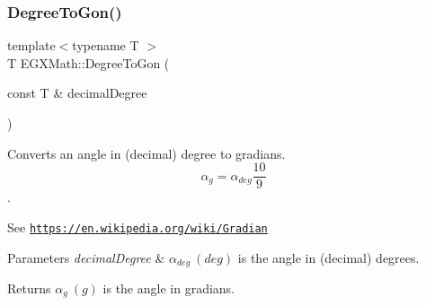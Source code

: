 \subsubsection{\texorpdfstring{Degree\+To\+Gon()}{DegreeToGon()}}
{\footnotesize\ttfamily template$<$typename T $>$ \\
T E\+G\+X\+Math\+::\+Degree\+To\+Gon (\begin{DoxyParamCaption}\item[{const T \&}]{decimal\+Degree }\end{DoxyParamCaption})}



Converts an angle in (decimal) degree to gradians. \[\alpha_{g}=\alpha_{deg}\frac{10}{9}\]. 

See \href{https://en.wikipedia.org/wiki/Gradian}{\tt https\+://en.\+wikipedia.\+org/wiki/\+Gradian} 
\begin{DoxyParams}{Parameters}
{\em decimal\+Degree} & $\alpha_{deg}\ (deg)$ is the angle in (decimal) degrees. \\
\hline
\end{DoxyParams}
\begin{DoxyReturn}{Returns}
$\alpha_{g}\ (g)$ is the angle in gradians. 
\end{DoxyReturn}

